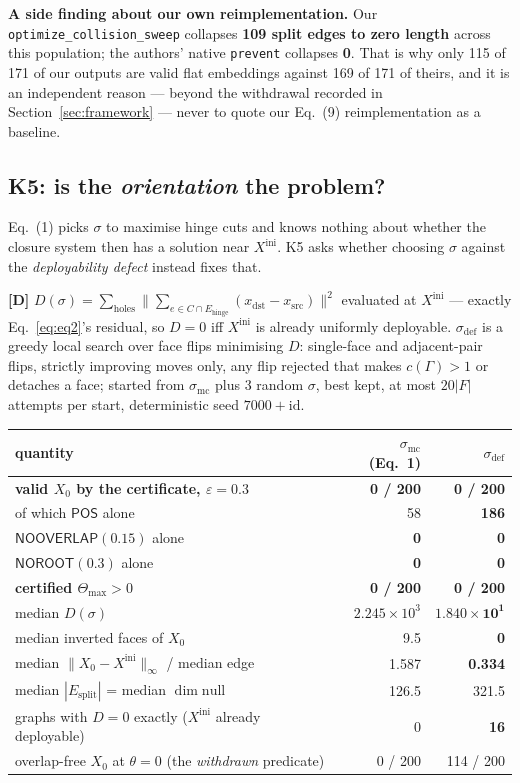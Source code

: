 \documentclass[11pt,a4paper]{article}
\theoremstyle{definition}
\newcommand{\Tmax}{\Theta_{\max}}
\newcommand{\Esplit}{E_{\mathrm{split}}}
\newcommand{\Ehinge}{E_{\mathrm{hinge}}}
\newcommand{\file}[1]{\texttt{\small #1}}
\newcommand{\POS}{\textsf{POS}}
\newcommand{\NOOV}{\textsf{NOOVERLAP}}
\newcommand{\NOROOT}{\textsf{NOROOT}}
\begin{document}
\textbf{A side finding about our own reimplementation.} Our
\file{optimize\_collision\_sweep} collapses \textbf{109 split edges to zero length} across
this population; the authors' native \file{prevent} collapses \textbf{0}. That is why only
115 of 171 of our outputs are valid flat embeddings against 169 of 171 of theirs, and it is an
independent reason --- beyond the withdrawal recorded in Section~\ref{sec:framework} --- never
to quote our Eq.~(9) reimplementation as a baseline.

\subsection{K5: is the \emph{orientation} the problem?}

Eq.~(1) picks $\sigma$ to maximise hinge cuts and knows nothing about whether the closure
system then has a solution near $X^{\mathrm{ini}}$. K5 asks whether choosing $\sigma$ against
the \emph{deployability defect} instead fixes that.

\textbf{[D]} $D(\sigma) = \sum_{\text{holes}}\bigl\|\sum_{e\in C\cap\Ehinge}
(x_{\mathrm{dst}}-x_{\mathrm{src}})\bigr\|^2$ evaluated at $X^{\mathrm{ini}}$ --- exactly
Eq.~\eqref{eq:eq2}'s residual, so $D=0$ iff $X^{\mathrm{ini}}$ is already uniformly
deployable. $\sigma_{\mathrm{def}}$ is a greedy local search over face flips minimising $D$:
single-face and adjacent-pair flips, strictly improving moves only, any flip rejected that
makes $c(\Gamma)>1$ or detaches a face; started from $\sigma_{\mathrm{mc}}$ plus 3 random
$\sigma$, best kept, at most $20|F|$ attempts per start, deterministic seed $7000+\mathrm{id}$.

\begin{center}
\small
\begin{tabular}{@{}lrr@{}}
\toprule
quantity & $\sigma_{\mathrm{mc}}$ (Eq.~1) & $\sigma_{\mathrm{def}}$ \\
\midrule
\textbf{valid $X_0$ by the certificate, $\varepsilon=0.3$} & \textbf{0 / 200} & \textbf{0 / 200} \\
\quad of which $\POS$ alone & 58 & \textbf{186} \\
\quad $\NOOV(0.15)$ alone & \textbf{0} & \textbf{0} \\
\quad $\NOROOT(0.3)$ alone & \textbf{0} & \textbf{0} \\
\textbf{certified $\Tmax>0$} & \textbf{0 / 200} & \textbf{0 / 200} \\
median $D(\sigma)$ & $2.245\times10^{3}$ & $\mathbf{1.840\times10^{1}}$ \\
median inverted faces of $X_0$ & 9.5 & \textbf{0} \\
median $\|X_0-X^{\mathrm{ini}}\|_\infty$ / median edge & 1.587 & \textbf{0.334} \\
median $|\Esplit|$ = median $\dim\mathrm{null}$ & 126.5 & 321.5 \\
graphs with $D=0$ exactly ($X^{\mathrm{ini}}$ already deployable) & 0 & \textbf{16} \\
overlap-free $X_0$ at $\theta=0$ (the \emph{withdrawn} predicate) & 0 / 200 & 114 / 200 \\
\bottomrule
\end{tabular}
\end{center}
\end{document}
